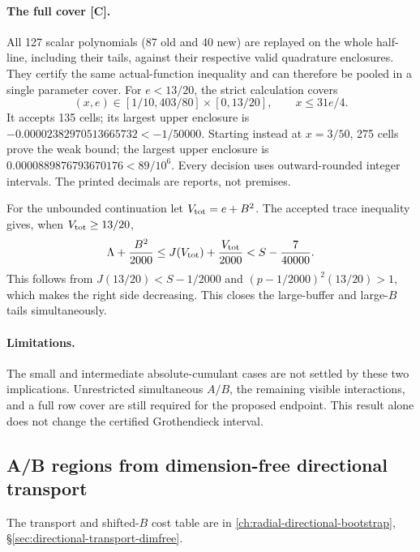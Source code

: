 \paragraph{The full cover [C].}
All 127 scalar polynomials (87 old and 40 new) are replayed on the whole
half-line, including their tails, against their respective valid quadrature
enclosures. They certify the same actual-function inequality and can
therefore be pooled in a single parameter cover. For \(e<13/20\), the strict calculation covers
\[
 (x,e)\in[1/10,403/80]\times[0,13/20],
 \qquad x\le31e/4.
\]
It accepts 135 cells; its largest upper enclosure is
\(-0.00002382970513665732<-1/50000\).
Starting instead at \(x=3/50\), 275 cells prove the weak bound; the largest
upper enclosure is \(0.0000889876793670176<89/10^6\).
Every decision uses outward-rounded integer intervals.
The printed decimals are reports, not premises.

For the unbounded continuation let \(V_{\rm tot}=e+B^2\).
The accepted trace inequality gives, when \(V_{\rm tot}\ge13/20\),
\[
 \Lambda+\frac{B^2}{2000}
 \le J(V_{\rm tot})+\frac{V_{\rm tot}}{2000}
 <S-\frac7{40000}.
\]
This follows from \(J(13/20)<S-1/2000\) and
\((p-1/2000)^2(13/20)>1\), which makes the right side decreasing.
This closes the large-buffer and large-\(B\) tails simultaneously.

\paragraph{Limitations.}
The small and intermediate absolute-cumulant cases are not settled by
these two implications. Unrestricted simultaneous \(A/B\), the remaining
visible interactions, and a full row cover are still required for the
proposed endpoint. This result alone does not change the certified
Grothendieck interval.

\subsection{A/B regions from dimension-free directional transport}\label{sec:k-ab-transport-regions}
The transport and shifted-$B$ cost table are in \autoref{ch:radial-directional-bootstrap}, \S\ref{sec:directional-transport-dimfree}.

